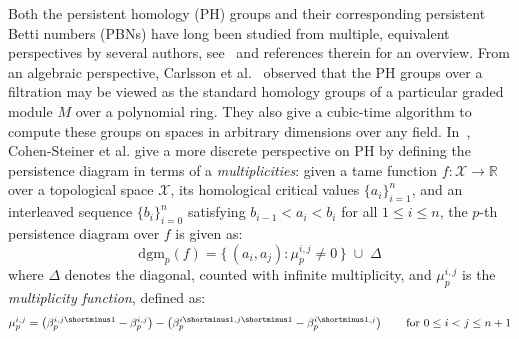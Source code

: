\newcommand\restr[2]{{%
  \left.\kern-\nulldelimiterspace %
  #1 %
  \vphantom{\big|} %
  \right|_{#2} %
  }}
  

Both the persistent homology (PH) groups and their corresponding persistent Betti numbers (PBNs) have long been studied from multiple, equivalent perspectives by several authors, see~\cite{cerri2013betti, chazal2016structure, cohen2005stability, zomorodian2004computing} and references therein for an overview. 
From an algebraic perspective, Carlsson et al.~\cite{zomorodian2004computing} observed that the PH groups over a filtration may be viewed as the standard homology groups of a particular graded module $M$ over a polynomial ring. They also give a cubic-time algorithm to compute these groups on spaces in arbitrary dimensions over any field. 
In~\cite{cohen2005stability}, Cohen-Steiner et al. give a more discrete perspective on PH by defining the persistence diagram in terms of a \emph{multiplicities}: given a tame function $f: \mathcal{X} \to \mathbb{R}$ over a topological space $\mathcal{X}$, its homological critical values $\{ a_i \}_{i=1}^n$, and an interleaved sequence $\{ b_i \}_{i=0}^n$ satisfying $b_{i-1} < a_i < b_i$ for all $1 \leq i \leq n$, the $p$-th persistence diagram over $f$ is given as: 
\begin{equation}
\mathrm{dgm}_p(f) = \{ \, (a_i, a_j) :  \mu_p^{i,j} \neq 0 \, \} \; \cup \; \Delta	
\end{equation}
where $\Delta$ denotes the diagonal, counted with infinite multiplicity, and $\mu_p^{i,j}$ is the  \emph{multiplicity function}, defined as: 
\begin{equation}\label{eq:multiplicity}
	\mu_p^{i,j} = \left(\beta_p^{i,j\shortminus1} - \beta_p^{i,j} \right) - \left(\beta_p^{i\shortminus1,j\shortminus1} - \beta_p^{i\shortminus1,j} \right) \quad\quad \text{for } 0 \leq i < j \leq n+ 1
\end{equation}
